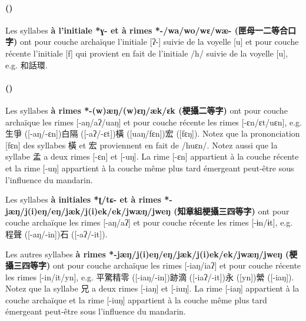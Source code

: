 \documentclass{scrbook}
\newcounter{c}[subsubsection]
\newcommand{\stpc}[1]{\stepcounter{#1}}
\newcommand{\termyyx}[1]{\textbf{#1}}
\begin{document}
\begin{sloppypar}
\stpc{c}\paragraph{()}
Les syllabes \termyyx{à l'initiale *ɣ- et à rimes *-/wa/wo/wɛ/wæ- (匣母一二等合口字)} ont pour couche archaïque l'initiale [ʔ-] suivie de la voyelle [u] et pour couche récente l'initiale [f] qui provient en fait de l'initiale /h/ suivie de la voyelle [u], e.g. 和話環. 

\stpc{c}\paragraph{()}
Les syllabes \termyyx{à rimes *-(w)æŋ/(w)ɛŋ/æk/ɛk (梗攝二等字)} ont pour couche archaïque les rimes [-aŋ/aʔ/uaŋ] et pour couche récente les rimes [-ɛn/ɛt/uɛn], e.g. 生爭 ([-aŋ/-ɛn])白隔 ([-aʔ/-ɛt])橫 ([uaŋ/fɛn])宏 ([fɛŋ]). Notez que la prononciation [fɛn] des syllabes 橫 et 宏 proviennent en fait de /huɛn/. Notez aussi que la syllabe 孟 a deux rimes [-ɛn] et [-uŋ]. La rime [-ɛn] appartient à la couche récente et la rime [-uŋ] appartient à la couche même plus tard émergeant peut-être sous l'influence du mandarin. 

Les syllabes \termyyx{à initiales *ʈ/tɕ- et à rimes *-jæŋ/j(i)eŋ/eŋ/jæk/j(i)ek/ek/jwæŋ/jweŋ (知章組梗攝三四等字)} ont pour couche archaïque les rimes [-aŋ/aʔ] et pour couche récente les rimes [-ɨn/ɨt], e.g. 程聲 ([-aŋ/-in])石 ([-aʔ/-it]). 

Les autres syllabes \termyyx{à rimes *-jæŋ/j(i)eŋ/eŋ/jæk/j(i)ek/ek/jwæŋ/jweŋ (梗攝三四等字)} ont pour couche archaïque les rimes [-iaŋ/iaʔ] et pour couche récente les rimes [-in/it/yn], e.g. 平驚精零 ([-iaŋ/-in])跡滴 ([-iaʔ/-it])永 ([yn])縈 ([-iaŋ]). Notez que la syllabe 兄 a deux rimes [-iaŋ] et [-iuŋ]. La rime [-iaŋ] appartient à la couche archaïque et la rime [-iuŋ] appartient à la couche même plus tard émergeant peut-être sous l'influence du mandarin.


\end{sloppypar}
\end{document}
